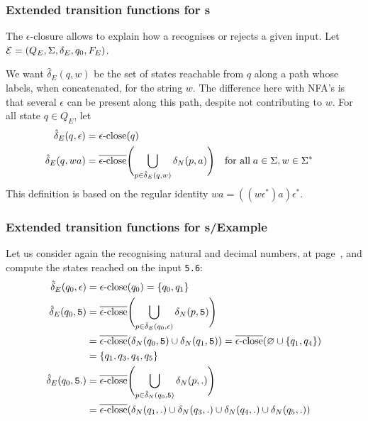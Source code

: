 %
\begin{frame}
\frametitle{Extended transition functions for {\eNFA}s}

The \(\epsilon\)-closure allows to explain how a \eNFA recognises or
rejects a given input. Let \({\cal E} = (Q_E, \Sigma, \delta_E, q_0,
F_E)\).

\bigskip

We want \(\hat{\delta}_E (q, w)\) be the set of states reachable from
\(q\) along a path whose labels, when concatenated, for the string
\(w\). The difference here with NFA's is that several \(\epsilon\) can
be present along this path, despite not contributing to \(w\).
For all state \(q \in Q_E\), let
\begin{align*}
   \hat{\delta}_E (q, \epsilon)
&= \epsilon\text{-close} (q)\\
   \hat{\delta}_E (q, wa)
&= \overline{\epsilon\text{-close}} \Biggl(\bigcup_{p \in \hat{\delta}_E (q, w)}{\delta_N (p,
     a)}\Biggr)
&& \text{for all} \; a \in \Sigma, w \in \Sigma^{*}
\end{align*}
This definition is based on the regular identity \(wa =
((w\epsilon^{*})a)\epsilon^{*}\).

\end{frame}

%
\begin{frame}[containsverbatim]
\frametitle{Extended transition functions for {\eNFA}s/Example}

Let us consider again the \eNFA recognising natural and decimal
numbers, at page~\pageref{enfa_num}, and compute the states reached on
the input \verb+5.6+:
\begin{align*}
   \hat{\delta}_E (q_0, \epsilon)
&= \epsilon\text{-close} (q_0) = \{q_0, q_1\}\\
   \hat{\delta}_E (q_0, \mathtt{5})
&= \overline{\epsilon\text{-close}} \Biggl( \bigcup_{p \in \hat{\delta}_E (q_0,
   \epsilon)}{\delta_N (p, \mathtt{5})} \Biggr)\\
&= \overline{\epsilon\text{-close}} (\delta_N (q_0, \mathtt{5}) \cup \delta_N (q_1,
   \mathtt{5})) = \overline{\epsilon\text{-close}} (\varnothing \cup \{q_1, q_4\})\\
&= \{q_1, q_3, q_4, q_5\}\\
   \hat{\delta}_E (q_0, \mathtt{5.})
&= \overline{\epsilon\text{-close}} \Biggl( \bigcup_{p \in \hat{\delta}_N (q_0,
   \mathtt{5})}{\delta_N (p, \mathtt{.})} \Biggr)\\
&= \overline{\epsilon\text{-close}} (\delta_N (q_1, \mathtt{.}) \cup \delta_N (q_3,
   \mathtt{.}) \cup \delta_N (q_4, \mathtt{.}) \cup \delta_N (q_5,
   \mathtt{.}))
\end{align*}

\end{frame}

